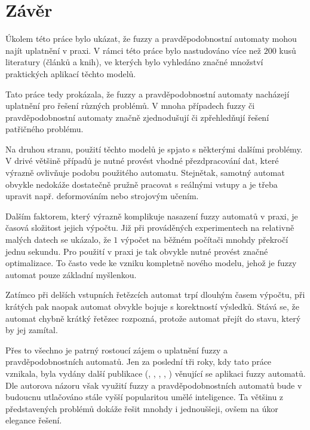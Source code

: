 \documentclass[a4paper,10pt]{article}
\begin{document}

\section{Závěr}
Úkolem této práce bylo ukázat, že fuzzy a pravděpodobnostní automaty mohou najít uplatnění v praxi. V rámci této práce bylo nastudováno více než $200$ kusů literatury (článků a knih), ve kterých bylo vyhledáno značné množství praktických aplikací těchto modelů.

Tato práce tedy prokázala, že fuzzy a pravděpodobnostní automaty nacházejí uplatnění pro řešení různých problémů. V mnoha případech fuzzy či pravděpodobnostní automaty značně zjednodušují či zpřehledňují řešení patřičného problému.

Na druhou stranu, použití těchto modelů je spjato s některými dalšími problémy. V drivé většině případů je nutné provést vhodné přezdpracování dat, které výrazně ovlivňuje podobu použitého automatu. Stejnětak, samotný automat obvykle nedokáže dostatečně pružně pracovat s reálnými vstupy a je třeba upravit např. deformováním nebo strojovým učením.

Dalším faktorem, který výrazně komplikuje nasazení fuzzy automatů v praxi, je časová složitost jejich výpočtu. Již při prováděných experimentech na relativně malých datech se ukázalo, že $1$ výpočet na běžném počítači mnohdy překročí jednu sekundu. Pro použití v praxi je tak obvykle nutné provést značné optimalizace. To často vede ke vzniku kompletně nového modelu, jehož je fuzzy automat pouze základní myšlenkou.

Zatímco při delších vstupních řetězcích automat trpí dlouhým časem výpočtu, při krátých pak naopak automat obvykle bojuje s korektností výsledků. Stává se, že automat chybně krátký řetězec rozpozná, protože automat  přejít do stavu, který by jej zamítal.

Přes to všechno je patrný rostoucí zájem o uplatnění fuzzy a pravděpodobnostních automatů. Jen za poslední tři roky, kdy tato práce vznikala, byla vydány další publikace (\cite{MukRay-StaSplMerProbFiStaAuSigRepAna}, \cite{ManPra-PriPatDetUsFiStMaFuzTra}, \cite{Jia+-ExHeaSimMetBasIntHumTheMod}, \cite{GupRah-CliMonUsFuzSys}, \cite{CamMerNun-UsFuzAutDiagPrHeaPro}) věnující se aplikaci fuzzy automatů. Dle autorova názoru však využití fuzzy a pravděpodobnostních automatů bude v budoucnu utlačováno stále vyšší popularitou umělé inteligence. Ta většinu z představených problémů dokáže řešit mnohdy i jednouššeji, ovšem na úkor elegance řešení.
\end{document}
